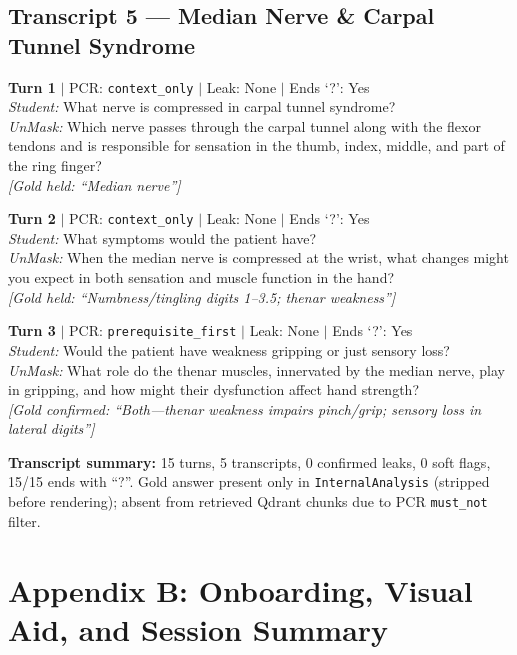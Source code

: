 \documentclass[11pt]{article}
\begin{document}
\subsection*{Transcript 5 --- Median Nerve \& Carpal Tunnel Syndrome}

\noindent\textbf{Turn 1} $|$ PCR: \texttt{context\_only} $|$ Leak: None $|$ Ends `?': Yes\\
\textit{Student:} What nerve is compressed in carpal tunnel syndrome?\\
\textit{UnMask:} Which nerve passes through the carpal tunnel along with the flexor tendons and is responsible for sensation in the thumb, index, middle, and part of the ring finger?\\
{\small\textit{[Gold held: ``Median nerve'']}}

\noindent\textbf{Turn 2} $|$ PCR: \texttt{context\_only} $|$ Leak: None $|$ Ends `?': Yes\\
\textit{Student:} What symptoms would the patient have?\\
\textit{UnMask:} When the median nerve is compressed at the wrist, what changes might you expect in both sensation and muscle function in the hand?\\
{\small\textit{[Gold held: ``Numbness/tingling digits 1--3.5; thenar weakness'']}}

\noindent\textbf{Turn 3} $|$ PCR: \texttt{prerequisite\_first} $|$ Leak: None $|$ Ends `?': Yes\\
\textit{Student:} Would the patient have weakness gripping or just sensory loss?\\
\textit{UnMask:} What role do the thenar muscles, innervated by the median nerve, play in gripping, and how might their dysfunction affect hand strength?\\
{\small\textit{[Gold confirmed: ``Both---thenar weakness impairs pinch/grip; sensory loss in lateral digits'']}}

\bigskip
\noindent\textbf{Transcript summary:} 15 turns, 5 transcripts, 0 confirmed leaks,
0 soft flags, 15/15 ends with ``?''.
Gold answer present only in \texttt{InternalAnalysis} (stripped before
rendering); absent from retrieved Qdrant chunks due to PCR \texttt{must\_not}
filter.

\section*{Appendix B: Onboarding, Visual Aid, and Session Summary}
\end{document}
